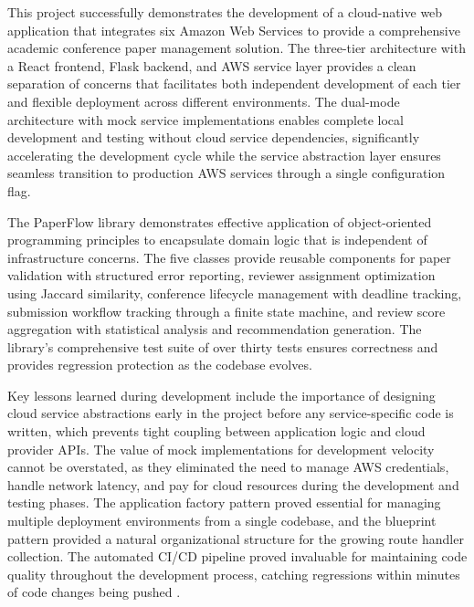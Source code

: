 \documentclass[conference]{IEEEtran}
\begin{document}
This project successfully demonstrates the development of a cloud-native web application that integrates six Amazon Web Services to provide a comprehensive academic conference paper management solution. The three-tier architecture with a React frontend, Flask backend, and AWS service layer provides a clean separation of concerns that facilitates both independent development of each tier and flexible deployment across different environments. The dual-mode architecture with mock service implementations enables complete local development and testing without cloud service dependencies, significantly accelerating the development cycle while the service abstraction layer ensures seamless transition to production AWS services through a single configuration flag.

The PaperFlow library demonstrates effective application of object-oriented programming principles to encapsulate domain logic that is independent of infrastructure concerns. The five classes provide reusable components for paper validation with structured error reporting, reviewer assignment optimization using Jaccard similarity, conference lifecycle management with deadline tracking, submission workflow tracking through a finite state machine, and review score aggregation with statistical analysis and recommendation generation. The library's comprehensive test suite of over thirty tests ensures correctness and provides regression protection as the codebase evolves.

Key lessons learned during development include the importance of designing cloud service abstractions early in the project before any service-specific code is written, which prevents tight coupling between application logic and cloud provider APIs. The value of mock implementations for development velocity cannot be overstated, as they eliminated the need to manage AWS credentials, handle network latency, and pay for cloud resources during the development and testing phases. The application factory pattern proved essential for managing multiple deployment environments from a single codebase, and the blueprint pattern provided a natural organizational structure for the growing route handler collection. The automated CI/CD pipeline proved invaluable for maintaining code quality throughout the development process, catching regressions within minutes of code changes being pushed \cite{humble2010continuous}.
\end{document}
